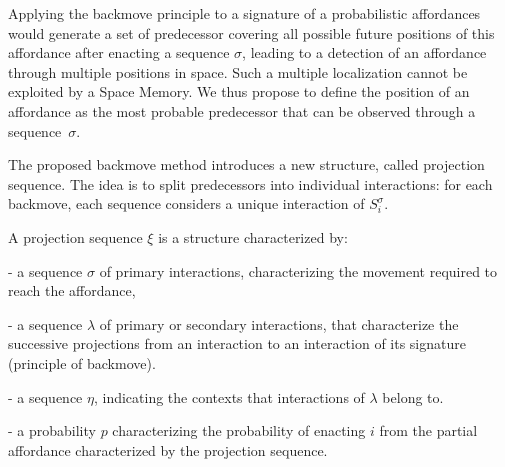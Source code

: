 \documentclass[conference]{IEEEtran}
\begin{document}
Applying the backmove principle to a signature of a probabilistic affordances would generate a set of predecessor covering all possible future positions of this affordance after enacting a sequence $\sigma$, leading to a detection of an affordance through multiple positions in space.
Such a multiple localization cannot be exploited by a Space Memory. We thus propose to define the position of an affordance as the most probable predecessor that can be observed through a sequence~$\sigma$.

The proposed backmove method introduces a new structure, called projection sequence. The idea is to split predecessors into individual interactions: for each backmove, each sequence considers a unique interaction of $S_i^{\sigma}$.

A projection sequence $\xi$ is a structure characterized by:

- a sequence $\sigma$ of primary interactions, characterizing the movement required to reach the affordance,

- a sequence $\lambda$ of primary or secondary interactions, that characterize the successive projections from an interaction to an interaction of its signature (principle of backmove).

- a sequence $\eta$, indicating the contexts that interactions of $\lambda$ belong to.

- a probability $p$ characterizing the probability of enacting $i$ from the partial affordance characterized by the projection sequence.
\end{document}
